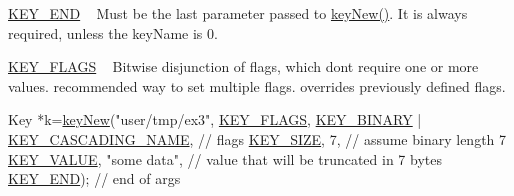\begin{DoxyItemize}
\item \hyperlink{group__key_gga9b703ca49f48b482def322b77d3e6bc8aa8adb6fcb92dec58fb19410eacfdd403}{K\+E\+Y\+\_\+\+E\+ND} ~\newline
 Must be the last parameter passed to \hyperlink{group__key_gad23c65b44bf48d773759e1f9a4d43b89}{key\+New()}. It is always required, unless the {\ttfamily key\+Name} is 0.
\item \hyperlink{group__key_gga9b703ca49f48b482def322b77d3e6bc8a4b83f86a07a7a0d6e24ecafe43cfea1b}{K\+E\+Y\+\_\+\+F\+L\+A\+GS} ~\newline
 Bitwise disjunction of flags, which don\textquotesingle{}t require one or more values. recommended way to set multiple flags. overrides previously defined flags. 
\begin{DoxyCodeInclude}
Key *k=\hyperlink{group__key_gad23c65b44bf48d773759e1f9a4d43b89}{keyNew}(\textcolor{stringliteral}{"user/tmp/ex3"},
        \hyperlink{group__key_gga9b703ca49f48b482def322b77d3e6bc8a4b83f86a07a7a0d6e24ecafe43cfea1b}{KEY\_FLAGS}, \hyperlink{group__key_gga9b703ca49f48b482def322b77d3e6bc8a1ca18d4e094ae7487d35ecedda2235ff}{KEY\_BINARY} | \hyperlink{group__key_gga9b703ca49f48b482def322b77d3e6bc8afc1567f74444ff9c219f7456b652b4ec}{KEY\_CASCADING\_NAME}, \textcolor{comment}{// flags}
        \hyperlink{group__key_gga9b703ca49f48b482def322b77d3e6bc8a6d531b5c41445d19d0452eebdccbfa01}{KEY\_SIZE}, 7,                    \textcolor{comment}{// assume binary length 7}
        \hyperlink{group__key_gga9b703ca49f48b482def322b77d3e6bc8ac66e4a49d09212b79f5754ca6db5bd2e}{KEY\_VALUE}, \textcolor{stringliteral}{"some data"},                \textcolor{comment}{// value that will be truncated in 7 bytes}
        \hyperlink{group__key_gga9b703ca49f48b482def322b77d3e6bc8aa8adb6fcb92dec58fb19410eacfdd403}{KEY\_END});                        \textcolor{comment}{// end of args}
\end{DoxyCodeInclude}


\end{DoxyItemize}
